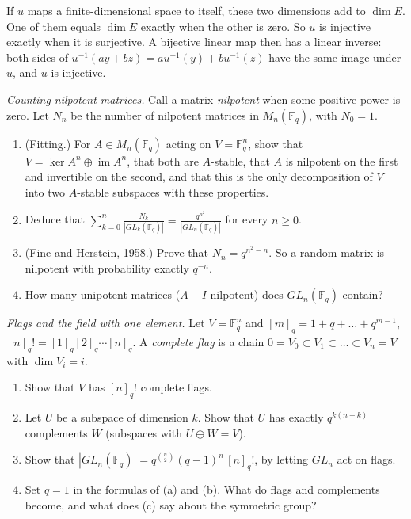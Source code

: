 \begin{reminder}
If $u$ maps a finite-dimensional space to itself, these two dimensions add to $\dim E$. One of them equals $\dim E$ exactly when the other is zero. So $u$ is injective exactly when it is surjective. A bijective linear map then has a linear inverse: both sides of $u^{-1}(ay+bz)=au^{-1}(y)+bu^{-1}(z)$ have the same image under $u$, and $u$ is injective.
\end{reminder}

\begin{exercise}[$\star\star\star$]\label{pb:nilpotent}
\emph{Counting nilpotent matrices.} Call a matrix \emph{nilpotent} when some positive power is zero. Let $N_n$ be the number of nilpotent matrices in $M_n(\mathbb F_q)$, with $N_0=1$.
\begin{enumerate}[label=(\alph*)]
\item (Fitting.) For $A\in M_n(\mathbb F_q)$ acting on $V=\mathbb F_q^n$, show that $V=\ker A^n\oplus\operatorname{im}A^n$,
that both are $A$-stable, that $A$ is nilpotent on the first and invertible on the second, and that this is the only
decomposition of $V$ into two $A$-stable subspaces with these properties.
\item Deduce that $\displaystyle\sum_{k=0}^n\frac{N_k}{|GL_k(\mathbb F_q)|}=\frac{q^{n^2}}{|GL_n(\mathbb F_q)|}$ for every $n\ge0$.
\item (Fine and Herstein, 1958.) Prove that $N_n=q^{n^2-n}$. So a random matrix is nilpotent with probability exactly $q^{-n}$.
\item How many unipotent matrices ($A-I$ nilpotent) does $GL_n(\mathbb F_q)$ contain?
\end{enumerate}
\end{exercise}

\begin{exercise}[$\star\star$]\label{pb:flags}
\emph{Flags and the field with one element.} Let $V=\mathbb F_q^n$ and $[m]_q=1+q+\dots+q^{m-1}$, $[n]_q!=[1]_q[2]_q\cdots[n]_q$.
A \emph{complete flag} is a chain $0=V_0\subset V_1\subset\dots\subset V_n=V$ with $\dim V_i=i$.
\begin{enumerate}[label=(\alph*)]
\item Show that $V$ has $[n]_q!$ complete flags.
\item Let $U$ be a subspace of dimension $k$. Show that $U$ has exactly $q^{k(n-k)}$ complements $W$ (subspaces with $U\oplus W=V$).
\item Show that $|GL_n(\mathbb F_q)|=q^{\binom n2}(q-1)^n\,[n]_q!$, by letting $GL_n$ act on flags.
\item Set $q=1$ in the formulas of (a) and (b). What do flags and complements become, and what does (c) say about the
symmetric group?
\end{enumerate}
\end{exercise}

